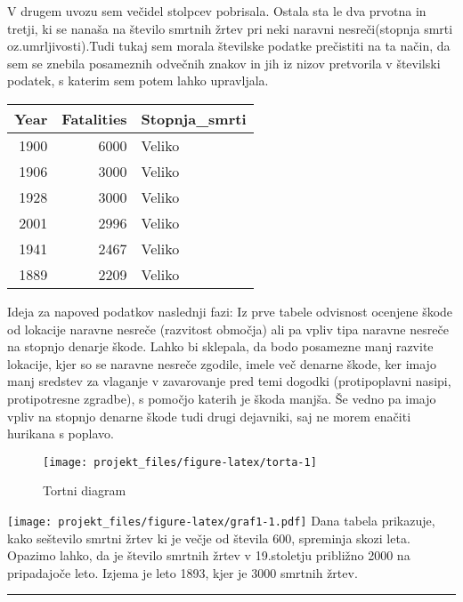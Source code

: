 \documentclass[]{article}
\begin{document}
V drugem uvozu sem večidel stolpcev pobrisala. Ostala sta le dva prvotna
in tretji, ki se nanaša na število smrtnih žrtev pri neki naravni
nesreči(stopnja smrti oz.umrljivosti).Tudi tukaj sem morala številske
podatke prečistiti na ta način, da sem se znebila posameznih odvečnih
znakov in jih iz nizov pretvorila v številski podatek, s katerim sem
potem lahko upravljala.

\begin{longtable}[c]{@{}rrl@{}}
\toprule
Year & Fatalities & Stopnja\_smrti\tabularnewline
\midrule
\endhead
1900 & 6000 & Veliko\tabularnewline
1906 & 3000 & Veliko\tabularnewline
1928 & 3000 & Veliko\tabularnewline
2001 & 2996 & Veliko\tabularnewline
1941 & 2467 & Veliko\tabularnewline
1889 & 2209 & Veliko\tabularnewline
\bottomrule
\end{longtable}

Ideja za napoved podatkov naslednji fazi: Iz prve tabele odvisnost
ocenjene škode od lokacije naravne nesreče (razvitost območja) ali pa
vpliv tipa naravne nesreče na stopnjo denarje škode. Lahko bi sklepala,
da bodo posamezne manj razvite lokacije, kjer so se naravne nesreče
zgodile, imele več denarne škode, ker imajo manj sredstev za vlaganje v
zavarovanje pred temi dogodki (protipoplavni nasipi, protipotresne
zgradbe), s pomočjo katerih je škoda manjša. Še vedno pa imajo vpliv na
stopnjo denarne škode tudi drugi dejavniki, saj ne morem enačiti
hurikana s poplavo.

\begin{figure}

{\centering \texttt{[image: projekt\_files/figure-latex/torta-1]} 

}

\caption{Tortni diagram}\label{fig:torta}
\end{figure}

\texttt{[image: projekt\_files/figure-latex/graf1-1.pdf]} Dana tabela
prikazuje, kako seštevilo smrtni žrtev ki je večje od števila 600,
spreminja skozi leta. Opazimo lahko, da je število smrtnih žrtev v
19.stoletju približno 2000 na pripadajoče leto. Izjema je leto 1893,
kjer je 3000 smrtnih žrtev.

\begin{center}\rule{0.5\linewidth}{\linethickness}\end{center}
\end{document}
